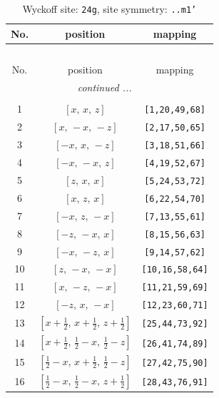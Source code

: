 \documentclass[fleqn,8pt]{jsarticle}
\begin{document}
\begin{longtable}{ccc}
\caption{Wyckoff site: {\tt 24g}, site symmetry: {\tt ..m1'}}
 \\
 \hline \hline
No. & position & mapping \\ \hline \endfirsthead

\multicolumn{2}{l}{\tablename\ \thetable{}} \\
 \hline \hline
No. & position & mapping \\ \hline \endhead

 \hline \hline
\multicolumn{2}{r}{\footnotesize\it continued ...} \\ \endfoot

 \hline \hline
\multicolumn{2}{r}{} \\ \endlastfoot

1 & $\left[ x,\, x,\, z \right]$ & {\tt [1,20,49,68]} \\ \hline
2 & $\left[ x,\, - x,\, - z \right]$ & {\tt [2,17,50,65]} \\ \hline
3 & $\left[ - x,\, x,\, - z \right]$ & {\tt [3,18,51,66]} \\ \hline
4 & $\left[ - x,\, - x,\, z \right]$ & {\tt [4,19,52,67]} \\ \hline
5 & $\left[ z,\, x,\, x \right]$ & {\tt [5,24,53,72]} \\ \hline
6 & $\left[ x,\, z,\, x \right]$ & {\tt [6,22,54,70]} \\ \hline
7 & $\left[ - x,\, z,\, - x \right]$ & {\tt [7,13,55,61]} \\ \hline
8 & $\left[ - z,\, - x,\, x \right]$ & {\tt [8,15,56,63]} \\ \hline
9 & $\left[ - x,\, - z,\, x \right]$ & {\tt [9,14,57,62]} \\ \hline
10 & $\left[ z,\, - x,\, - x \right]$ & {\tt [10,16,58,64]} \\ \hline
11 & $\left[ x,\, - z,\, - x \right]$ & {\tt [11,21,59,69]} \\ \hline
12 & $\left[ - z,\, x,\, - x \right]$ & {\tt [12,23,60,71]} \\ \hline
13 & $\left[ x + \frac{1}{2},\, x + \frac{1}{2},\, z + \frac{1}{2} \right]$ & {\tt [25,44,73,92]} \\ \hline
14 & $\left[ x + \frac{1}{2},\, \frac{1}{2} - x,\, \frac{1}{2} - z \right]$ & {\tt [26,41,74,89]} \\ \hline
15 & $\left[ \frac{1}{2} - x,\, x + \frac{1}{2},\, \frac{1}{2} - z \right]$ & {\tt [27,42,75,90]} \\ \hline
16 & $\left[ \frac{1}{2} - x,\, \frac{1}{2} - x,\, z + \frac{1}{2} \right]$ & {\tt [28,43,76,91]} \\ \hline

\end{longtable}
\end{document}

